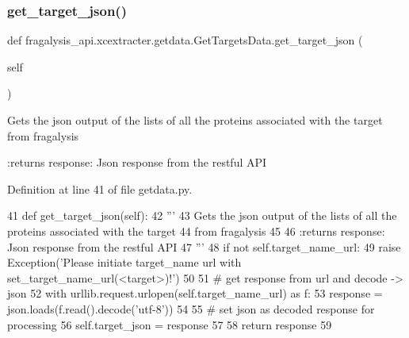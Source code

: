 \subsubsection{\texorpdfstring{get\+\_\+target\+\_\+json()}{get\_target\_json()}}
{\footnotesize\ttfamily def fragalysis\+\_\+api.\+xcextracter.\+getdata.\+Get\+Targets\+Data.\+get\+\_\+target\+\_\+json (\begin{DoxyParamCaption}\item[{}]{self }\end{DoxyParamCaption})}

\begin{DoxyVerb}Gets the json output of the lists of all the proteins associated with the target
from fragalysis

:returns response: Json response from the restful API
\end{DoxyVerb}
 

Definition at line 41 of file getdata.\+py.


\begin{DoxyCode}
41     \textcolor{keyword}{def }get\_target\_json(self):
42         \textcolor{stringliteral}{'''}
43 \textcolor{stringliteral}{        Gets the json output of the lists of all the proteins associated with the target}
44 \textcolor{stringliteral}{        from fragalysis}
45 \textcolor{stringliteral}{}
46 \textcolor{stringliteral}{        :returns response: Json response from the restful API}
47 \textcolor{stringliteral}{        '''}
48         \textcolor{keywordflow}{if} \textcolor{keywordflow}{not} self.target\_name\_url:
49             \textcolor{keywordflow}{raise} Exception(\textcolor{stringliteral}{'Please initiate target\_name url with set\_target\_name\_url(<target>)!'})
50 
51         \textcolor{comment}{# get response from url and decode -> json}
52         with urllib.request.urlopen(self.target\_name\_url) \textcolor{keyword}{as} f:
53             response = json.loads(f.read().decode(\textcolor{stringliteral}{'utf-8'}))
54 
55         \textcolor{comment}{# set json as decoded response for processing}
56         self.target\_json = response
57 
58         \textcolor{keywordflow}{return} response
59 
\end{DoxyCode}
\mbox{\label{classfragalysis__api_1_1xcextracter_1_1getdata_1_1_get_targets_data_abf5179a2489b7edaa16dc6bc8c89f051}} 
